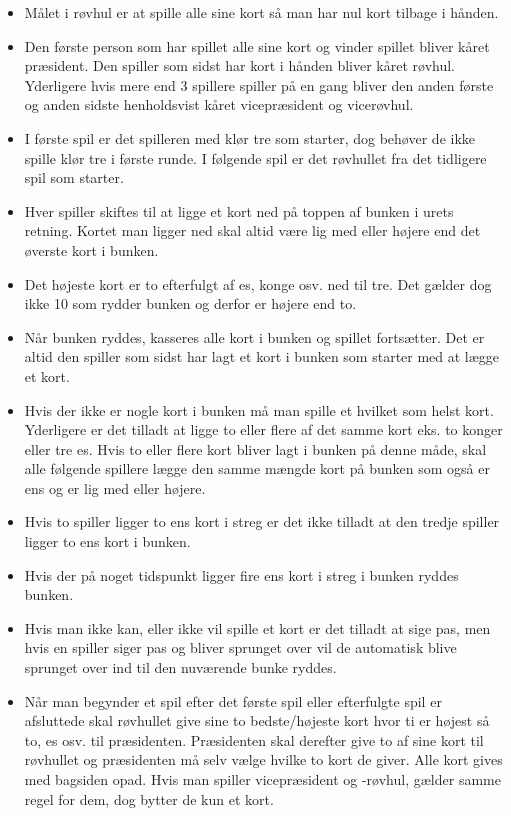 \documentclass[a4paper, 12pt]{article}
\begin{document}
\begin{itemize}
    \item Målet i røvhul er at spille alle sine kort så man har nul kort tilbage i hånden.
    \item Den første person som har spillet alle sine kort og vinder spillet bliver kåret præsident. Den spiller som sidst har kort i hånden bliver kåret røvhul. Yderligere hvis mere end 3 spillere spiller på en gang bliver den anden første og anden sidste henholdsvist kåret vicepræsident og vicerøvhul.
    \item I første spil er det spilleren med klør tre som starter, dog behøver de ikke spille klør tre i første runde. I følgende spil er det røvhullet fra det tidligere spil som starter.
    \item Hver spiller skiftes til at ligge et kort ned på toppen af bunken i urets retning. Kortet man ligger ned skal altid være lig med eller højere end det øverste kort i bunken. 
    \item Det højeste kort er to efterfulgt af es, konge osv. ned til tre. Det gælder dog ikke 10 som rydder bunken og derfor er højere end to.
    \item Når bunken ryddes, kasseres alle kort i bunken og spillet fortsætter. Det er altid den spiller som sidst har lagt et kort i bunken som starter med at lægge et kort.
    \item Hvis der ikke er nogle kort i bunken må man spille et hvilket som helst kort. Yderligere er det tilladt at ligge to eller flere af det samme kort eks. to konger eller tre es. Hvis to eller flere kort bliver lagt i bunken på denne måde, skal alle følgende spillere lægge den samme mængde kort på bunken som også er ens og er lig med eller højere.
    \item Hvis to spiller ligger to ens kort i streg er det ikke tilladt at den tredje spiller ligger to ens kort i bunken.
    \item Hvis der på noget tidspunkt ligger fire ens kort i streg i bunken ryddes bunken.
    \item Hvis man ikke kan, eller ikke vil spille et kort er det tilladt at sige pas, men hvis en spiller siger pas og bliver sprunget over vil de automatisk blive sprunget over ind til den nuværende bunke ryddes.
    \item Når man begynder et spil efter det første spil eller efterfulgte spil er afsluttede skal røvhullet give sine to bedste/højeste kort hvor ti er højest så to, es osv. til præsidenten. Præsidenten skal derefter give to af sine kort til røvhullet og præsidenten må selv vælge hvilke to kort de giver. Alle kort gives med bagsiden opad. Hvis man spiller vicepræsident og -røvhul, gælder samme regel for dem, dog bytter de kun et kort. 
\end{itemize}
\bigbreak
\end{document}
